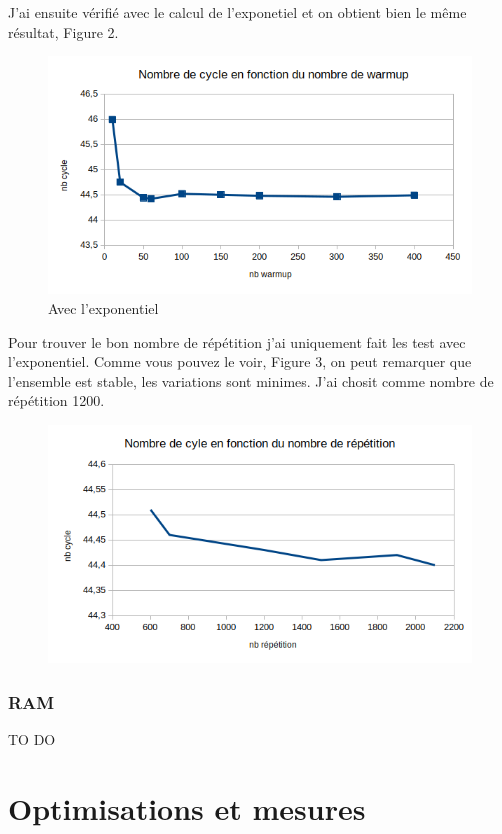 \documentclass[12pt,a4paper]{article}
\begin{document}
J'ai ensuite vérifié avec le calcul de l'exponetiel et on obtient bien le 
même résultat, Figure 2. 

\begin{figure}
    \includegraphics[scale=0.8]{figures/L2/L2warmup2.png}
    \caption{Avec l'exponentiel}
\end{figure}


Pour trouver le bon nombre de répétition j'ai uniquement fait les test avec
l'exponentiel. 
Comme vous pouvez le voir, Figure 3, on peut remarquer que l'ensemble est stable, les
variations sont minimes. J'ai chosit comme nombre de répétition 1200.
\begin{figure}
    \includegraphics[scale=0.8]{figures/L2/L2repet.png}
    \caption{ }
\end{figure}

\subsubsection{RAM}
TO DO


\section{Optimisations et mesures}
\end{document}
